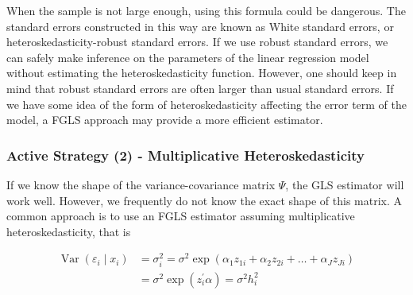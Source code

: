 When the sample is not large enough, using this formula could be dangerous. The standard errors constructed in this way are known as White standard errors, or heteroskedasticity-robust standard errors. If we use robust standard errors, we can safely make inference on the parameters of the linear regression model without estimating the heteroskedasticity function. However, one should keep in mind that robust standard errors are often larger than usual standard errors. If we have some idea of the form of heteroskedasticity affecting the error term of the model, a FGLS approach may provide a more efficient estimator.

\subsubsection{Active Strategy (2) - Multiplicative Heteroskedasticity}
If we know the shape of the variance-covariance matrix $\Psi$, the GLS estimator will work well. However, we frequently do not know the exact shape of this matrix. A common approach is to use an FGLS estimator assuming multiplicative heteroskedasticity, that is

$$
\begin{aligned}
\operatorname{Var}\left(\varepsilon_{i} \mid x_{i}\right) & =\sigma_{i}^{2}=\sigma^{2} \exp \left(\alpha_{1} z_{1 i}+\alpha_{2} z_{2 i}+\ldots+\alpha_{J} z_{J i}\right) \\
& =\sigma^{2} \exp \left(z_{i}^{\prime} \alpha\right)=\sigma^{2} h_{i}^{2}
\end{aligned}
$$


